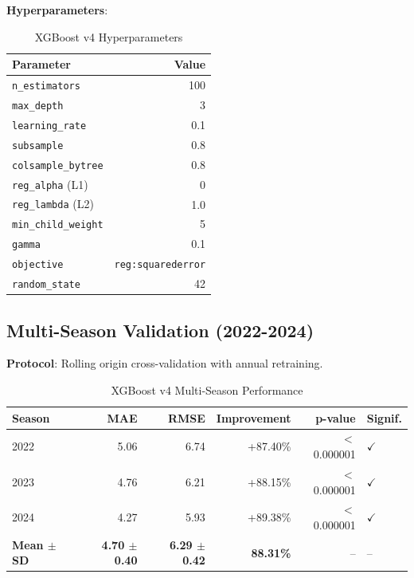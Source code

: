 \textbf{Hyperparameters}:
\begin{table}[htbp]
\centering
\caption{XGBoost v4 Hyperparameters}
\label{tab:xgboost-v4-hyperparameters}
\begin{tabular}{lr}
\toprule
\textbf{Parameter} & \textbf{Value} \\
\midrule
\texttt{n\_estimators} & 100 \\
\texttt{max\_depth} & 3 \\
\texttt{learning\_rate} & 0.1 \\
\texttt{subsample} & 0.8 \\
\texttt{colsample\_bytree} & 0.8 \\
\texttt{reg\_alpha} (L1) & 0 \\
\texttt{reg\_lambda} (L2) & 1.0 \\
\texttt{min\_child\_weight} & 5 \\
\texttt{gamma} & 0.1 \\
\texttt{objective} & \texttt{reg:squarederror} \\
\texttt{random\_state} & 42 \\
\bottomrule
\end{tabular}
\end{table}

\subsection{Multi-Season Validation (2022-2024)}

\textbf{Protocol}: Rolling origin cross-validation with annual retraining.

\begin{table}[htbp]
\centering
\caption{XGBoost v4 Multi-Season Performance}
\label{tab:xgboost-v4-multisea son}
\small
\setlength{\tabcolsep}{4pt}
\begin{tabular}{@{}lrrrrl@{}}
\toprule
\textbf{Season} & \textbf{MAE} & \textbf{RMSE} & \textbf{Improvement} & \textbf{p-value} & \textbf{Signif.} \\
\midrule
2022 & 5.06 & 6.74 & +87.40\% & $<$0.000001 & $\checkmark$ \\
2023 & 4.76 & 6.21 & +88.15\% & $<$0.000001 & $\checkmark$ \\
2024 & 4.27 & 5.93 & +89.38\% & $<$0.000001 & $\checkmark$ \\
\midrule
\textbf{Mean $\pm$ SD} & \textbf{4.70 $\pm$ 0.40} & \textbf{6.29 $\pm$ 0.42} & \textbf{88.31\%} & -- & -- \\
\bottomrule
\end{tabular}
\end{table}

